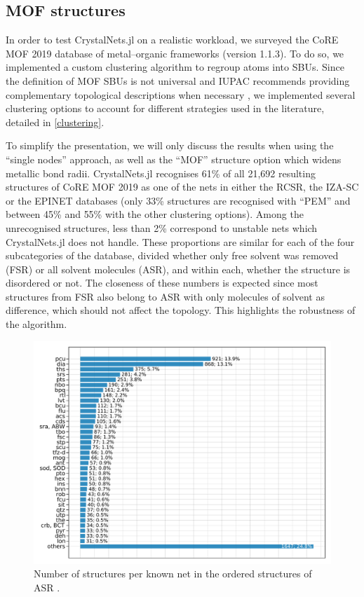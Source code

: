 \documentclass[main.tex]{subfiles}
\begin{document}


\subsection{MOF structures}

In order to test CrystalNets.jl on a realistic workload, we surveyed the CoRE MOF 2019 \autocite{CoREMOF} database of metal--organic frameworks (version 1.1.3). To do so, we implemented a custom clustering algorithm to regroup atoms into SBUs. Since the definition of MOF SBUs is not universal \autocite{SBUs} and IUPAC recommends providing complementary topological descriptions when necessary \autocite{IUPAC_SBU}, we implemented several clustering options to account for different strategies used in the literature, detailed in \cref{clustering}.


To simplify the presentation, we will only discuss the results when using the ``single nodes'' approach, as well as the ``MOF'' structure option which widens metallic bond radii. CrystalNets.jl recognises {61\%} of all 21,692 resulting structures of CoRE MOF 2019 as one of the nets in either the RCSR, the IZA-SC or the EPINET databases (only {33\%} structures are recognised with ``PEM'' and between {45\%} and {55\%} with the other clustering options). Among the unrecognised structures, less than {2\%} correspond to unstable nets which CrystalNets.jl does not handle.
These proportions are similar for each of the four subcategories of the database, divided whether only free solvent was removed (FSR) or all solvent molecules (ASR), and within each, whether the structure is disordered or not. The closeness of these numbers is expected since most structures from FSR also belong to ASR with only molecules of solvent as difference, which should not affect the topology. This highlights the robustness of the algorithm.

\begin{figure}
	\centering
	\includegraphics[width=\linewidth]{figures/topology/numstructpernet.pdf}
	\caption{Number of structures per known net in the ordered structures of ASR \autocite{CoREMOF}.}
	\label{numstructpernet}
\end{figure}
\end{document}
